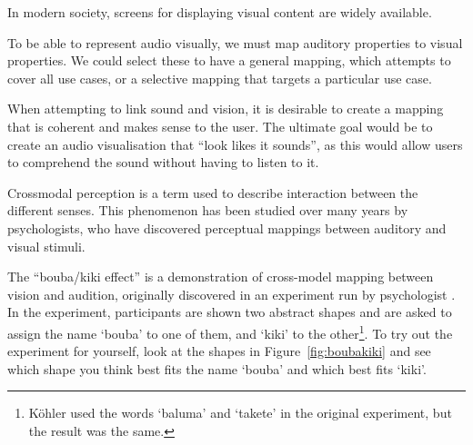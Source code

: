 In modern society, screens for displaying visual content are widely available.

To be able to represent audio visually, we must map auditory properties to visual properties. We could select these 
to have a general mapping, which attempts to cover all use cases, or a selective mapping that targets a particular use
case.

When attempting to link sound and vision, it is desirable to create a mapping that is coherent and makes sense to the
user. The ultimate goal would be to create an audio visualisation that ``look likes it sounds'', as this would
allow users to comprehend the sound without having to listen to it.




Crossmodal perception is a term used to describe interaction between the different senses. This phenomenon has been
studied over many years by psychologists, who have discovered perceptual mappings between auditory and visual stimuli.

The ``bouba/kiki effect'' is a demonstration of cross-model mapping between vision and audition, originally discovered
in an experiment run by psychologist \citet{Koehler1929}. In the experiment, participants are shown two abstract shapes
and are asked to assign the name `bouba' to one of them, and `kiki' to the other\footnote{K\"ohler used the words
  `baluma' and `takete' in the original experiment, but the result was the same.}. To try out the experiment for
yourself, look at the shapes in Figure~\ref{fig:boubakiki} and see which shape you think best fits the name `bouba' and
which best fits `kiki'.

